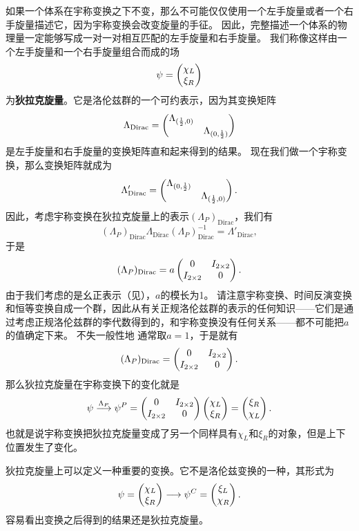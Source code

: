 \documentclass[hyperref, UTF8, a4paper]{ctexart}
\renewcommand{\autoref}{\prettyref}
\begin{document}
如果一个体系在宇称变换之下不变，那么不可能仅仅使用一个左手旋量或者一个右手旋量描述它，因为宇称变换会改变旋量的手征。
因此，完整描述一个体系的物理量一定能够写成一对一对相互匹配的左手旋量和右手旋量。
我们称像这样由一个左手旋量和一个右手旋量组合而成的场
\begin{equation}
    \psi = \pmqty{\chi_L \\ \xi_R}
\end{equation}
为\textbf{狄拉克旋量}。它是洛伦兹群的一个可约表示，因为其变换矩阵
\begin{equation}
    \Lambda_\text{Dirac} = \pmqty{\dmat{\Lambda_{(\frac{1}{2}, 0)}, \Lambda_{(0, \frac{1}{2})}}}
\end{equation}
是左手旋量和右手旋量的变换矩阵直和起来得到的结果。
现在我们做一个宇称变换，那么变换矩阵就成为
\[
    \Lambda'_\text{Dirac} = \pmqty{\dmat{\Lambda_{(0, \frac{1}{2})}, \Lambda_{(\frac{1}{2}, 0)}}}.
\]
因此，考虑宇称变换在狄拉克旋量上的表示$(\Lambda_P)_\text{Dirac}$，我们有
\[
    (\Lambda_P)_\text{Dirac} \Lambda_\text{Dirac} (\Lambda_P)_\text{Dirac}^{-1} = \Lambda'_\text{Dirac},
\]
于是
\[
    (\Lambda_P)_\text{Dirac} = a \pmqty{0 & I_{2\times 2} \\ I_{2 \times 2} & 0}.
\]
由于我们考虑的是幺正表示（见\autoref{sec:rep-th}），$a$的模长为1。
请注意宇称变换、时间反演变换和恒等变换自成一个群，因此从有关正规洛伦兹群的表示的任何知识——它们是通过考虑正规洛伦兹群的李代数得到的，和宇称变换没有任何关系——都不可能把$a$的值确定下来。
不失一般性地%
通常取$a=1$，于是就有
\begin{equation}
    (\Lambda_P)_\text{Dirac} = \pmqty{0 & I_{2\times 2} \\ I_{2 \times 2} & 0}.
\end{equation}
那么狄拉克旋量在宇称变换下的变化就是
\begin{equation}
    \psi \stackrel{\Lambda_P}{\longrightarrow} \psi^P = \pmqty{0 & I_{2\times 2} \\ I_{2 \times 2} & 0} \pmqty{\chi_L \\ \xi_R} = \pmqty{\xi_R \\ \chi_L}.
\end{equation}
也就是说宇称变换把狄拉克旋量变成了另一个同样具有$\chi_L$和$\xi_R$的对象，但是上下位置发生了变化。

狄拉克旋量上可以定义一种重要的变换。它不是洛伦兹变换的一种，其形式为
\begin{equation}
    \psi = \pmqty{\chi_L \\ \xi_R} \longrightarrow \psi^C = \pmqty{\xi_L \\ \chi_R}.
\end{equation}
容易看出变换之后得到的结果还是狄拉克旋量。
\end{document}
